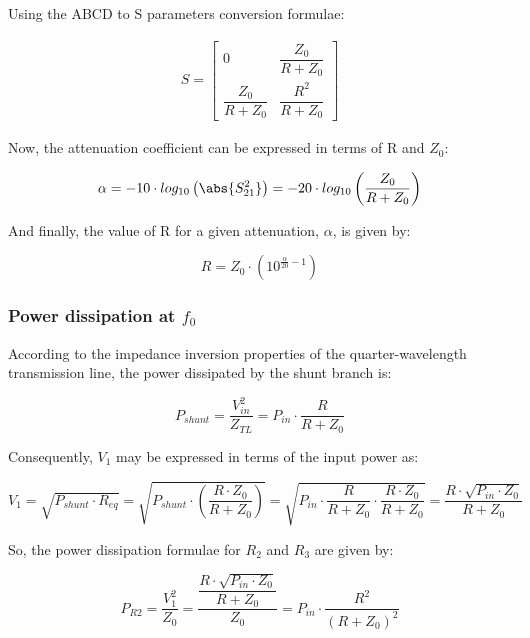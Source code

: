 \noindent Using the ABCD to S parameters conversion formulae:

\begin{gather}
 S = 
 \begin{bmatrix} 0 & \dfrac{Z_0}{R + Z_0} \\ \dfrac{Z_0}{R + Z_0} & \dfrac{R^2}{R + Z_0} \end{bmatrix}
\end{gather}


\noindent Now, the attenuation coefficient can be expressed in terms of R and $Z_0$:

\begin{equation}
\alpha = -10 \cdot log_{10} \left( \abs{S_{21}^2}\right) = -20 \cdot log_{10} \left(  \dfrac{Z_0}{R + Z_0}\right)
\end{equation}

\noindent And finally, the value of R for a given attenuation, $\alpha$, is given by:

\begin{equation}
R = Z_0 \cdot \left( 10^{\frac{\alpha}{20} - 1}\right)
\end{equation}

\subsubsection{Power dissipation at $f_0$}

\noindent According to the impedance inversion properties of the quarter-wavelength transmission line, the power dissipated by the shunt branch is:

\begin{equation}
P_{shunt} = \dfrac{V_{in}^2}{Z_{TL} } = P_{in} \cdot \dfrac{R}{R + Z_0}
\end{equation}

\noindent Consequently, $V_1$ may be expressed in terms of the input power as:

\begin{equation}
V_1 = \sqrt{P_{shunt} \cdot R_{eq}} = \sqrt{P_{shunt} \cdot \left( \dfrac{R \cdot Z_0}{R + Z_0}\right)} = \sqrt{P_{in} \cdot \dfrac{R}{R + Z_0} \cdot \dfrac{R \cdot Z_0}{R + Z_0}} = \dfrac{R \cdot \sqrt{P_{in} \cdot Z_0}}{R + Z_0}
\end{equation}

\noindent So, the power dissipation formulae for $R_2$ and $R_3$ are given by:

\begin{equation}
P_{R2} = \dfrac{V_1^2}{Z_0} = \dfrac{\dfrac{R \cdot \sqrt{P_{in} \cdot Z_0}}{R + Z_0}}{Z_0} = P_{in} \cdot \dfrac{R^2}{(R + Z_0)^2}
\end{equation}

